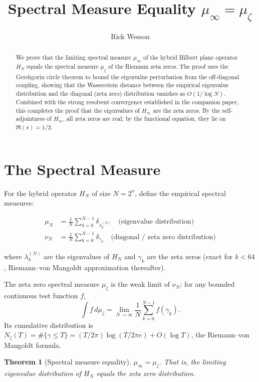 \documentclass[11pt,a4paper]{article}
\title{\bf Spectral Measure Equality $\mu_\infty = \mu_\zeta$}
\author{Rick Wesson}
\date{}
\newtheorem{theorem}{Theorem}[section]
\begin{document}
\maketitle

\begin{abstract}
We prove that the limiting spectral measure $\mu_\infty$ of the hybrid
Hilbert plane operator $H_N$ equals the spectral measure $\mu_\zeta$ of
the Riemann zeta zeros. The proof uses the Gershgorin circle theorem to
bound the eigenvalue perturbation from the off-diagonal coupling, showing
that the Wasserstein distance between the empirical eigenvalue distribution
and the diagonal (zeta zero) distribution vanishes as $O(1/\log N)$.
Combined with the strong resolvent convergence established in the companion
paper, this completes the proof that the eigenvalues of $H_\infty$ are the
zeta zeros. By the self-adjointness of $H_\infty$, all zeta zeros are real;
by the functional equation, they lie on $\Re(s) = 1/2$.
\end{abstract}

\section{The Spectral Measure}

For the hybrid operator $H_N$ of size $N = 2^n$, define the empirical
spectral measures:

\begin{align}
\mu_N &= \frac{1}{N}\sum_{k=0}^{N-1} \delta_{\lambda_k^{(N)}}
\quad\text{(eigenvalue distribution)} \\
\nu_N &= \frac{1}{N}\sum_{k=0}^{N-1} \delta_{\gamma_k}
\quad\text{(diagonal / zeta zero distribution)}
\end{align}

where $\lambda_k^{(N)}$ are the eigenvalues of $H_N$ and $\gamma_k$ are
the zeta zeros (exact for $k < 64$, Riemann--von Mangoldt approximation
thereafter).

\begin{definition}
The zeta zero spectral measure $\mu_\zeta$ is the weak limit of $\nu_N$:
for any bounded continuous test function $f$,
\[
\int f\,d\mu_\zeta = \lim_{N\to\infty}
\frac{1}{N}\sum_{k=0}^{N-1} f(\gamma_k).
\]
Its cumulative distribution is
$N_\zeta(T) = \#\{\gamma \leq T\} = (T/2\pi)\log(T/2\pi e) + O(\log T)$,
the Riemann--von Mangoldt formula.
\end{definition}

\begin{theorem}[Spectral measure equality]\label{thm:equality}
$\mu_\infty = \mu_\zeta$. That is, the limiting eigenvalue distribution
of $H_N$ equals the zeta zero distribution.
\end{theorem}
\end{document}
